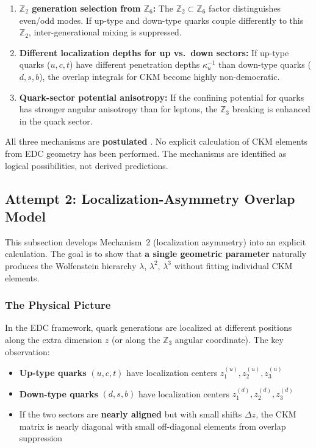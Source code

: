 \begin{enumerate}
    \item \textbf{$\mathbb{Z}_2$ generation selection from $\mathbb{Z}_6$:}
          The $\mathbb{Z}_2 \subset \mathbb{Z}_6$ factor distinguishes even/odd
          modes. If up-type and down-type quarks couple differently to this
          $\mathbb{Z}_2$, inter-generational mixing is suppressed.

    \item \textbf{Different localization depths for up vs.\ down sectors:}
          If up-type quarks ($u, c, t$) have different penetration depths
          $\kappa_u^{-1}$ than down-type quarks ($d, s, b$), the overlap
          integrals for CKM become highly non-democratic.

    \item \textbf{Quark-sector potential anisotropy:}
          If the confining potential for quarks has stronger angular anisotropy
          than for leptons, the $\mathbb{Z}_3$ breaking is enhanced in the
          quark sector.
\end{enumerate}

\begin{tcolorbox}[edcGuardrail, title=\textbf{Status}]
All three mechanisms are \textbf{postulated} \tagP{}. No explicit calculation
of CKM elements from EDC geometry has been performed. The mechanisms are
identified as logical possibilities, not derived predictions.
\end{tcolorbox}

\subsection{Attempt 2: Localization-Asymmetry Overlap Model}
\label{sec:ch7_attempt2}

This subsection develops Mechanism~2 (localization asymmetry) into an explicit
calculation. The goal is to show that \textbf{a single geometric parameter}
naturally produces the Wolfenstein hierarchy $\lambda$, $\lambda^2$, $\lambda^3$
without fitting individual CKM elements.

\subsubsection{The Physical Picture}

In the EDC framework, quark generations are localized at different positions
along the extra dimension $z$ (or along the $\mathbb{Z}_3$ angular coordinate).
The key observation:
\begin{itemize}[nosep]
    \item \textbf{Up-type quarks} $(u, c, t)$ have localization centers
          $z_1^{(u)}, z_2^{(u)}, z_3^{(u)}$
    \item \textbf{Down-type quarks} $(d, s, b)$ have localization centers
          $z_1^{(d)}, z_2^{(d)}, z_3^{(d)}$
    \item If the two sectors are \textbf{nearly aligned} but with small shifts
          $\Delta z$, the CKM matrix is nearly diagonal with small off-diagonal
          elements from overlap suppression
\end{itemize}

